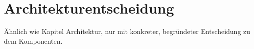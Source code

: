 \section{Architekturentscheidung}
Ähnlich wie Kapitel Architektur, nur mit konkreter, begründeter Entscheidung zu dem Komponenten.